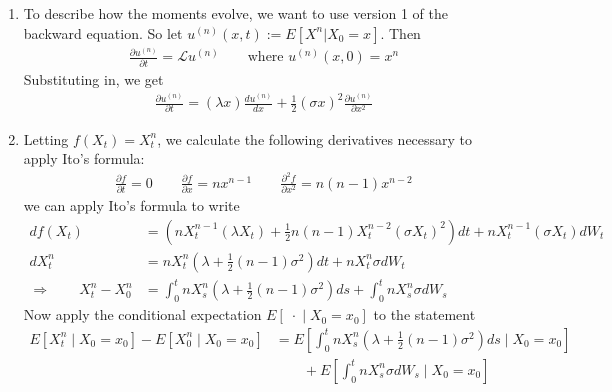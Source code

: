 \documentclass[12pt]{article}
\theoremstyle{plain}
\theoremstyle{definition}
\theoremstyle{remark}
\begin{document}
\begin{enumerate}
\begin{enumerate}
      \item %
        To describe how the moments evolve, we want to use version 1 of
        the backward equation. So let $u^{(n)}(x,t):=E[X^n|X_0=x]$. Then
        \begin{align*}
          \frac{\partial u^{(n)}}{\partial t} = \mathscr{L} u^{(n)}
          \qquad
          \text{where } u^{(n)}(x,0) = x^n
        \end{align*}
        Substituting in, we get
        \begin{align*}
          \frac{\partial u^{(n)}}{\partial t} =
          (\lambda x) \frac{du^{(n)}}{dx}
          + \frac{1}{2}(\sigma x)^2 \frac{\partial u^{(n)}}{\partial x^2}
        \end{align*}


      \item %
        Letting $f(X_t) = X_t^n$, we calculate the following derivatives
        necessary to apply Ito's formula:
        \begin{align*}
          \frac{\partial f}{\partial t} = 0
          \qquad
          \frac{\partial f}{\partial x} = nx^{n-1}
          \qquad
          \frac{\partial^2 f}{\partial x^2} = n(n-1)x^{n-2}
        \end{align*}
        we can apply Ito's formula to write
        \begin{align*}
          df(X_t)
          &= \left(
            nX_t^{n-1} (\lambda X_t)
            + \frac{1}{2}n(n-1)X_t^{n-2} (\sigma X_t)^2
            \right) dt
            + n X_t^{n-1} (\sigma X_t)dW_t \\
          dX^n_t
          &= nX_t^{n}\left(
            \lambda + \frac{1}{2}(n-1) \sigma^2
            \right) dt
            + n X_t^{n} \sigma dW_t \\
          \Rightarrow\qquad
          X^n_t - X^n_0
          &= \int^t_0 nX_s^{n}\left(
            \lambda + \frac{1}{2}(n-1) \sigma^2
            \right) ds
            + \int^t_0 n X_s^{n} \sigma dW_s
        \end{align*}
        Now apply the conditional expectation $E[\;\cdot\;|\; X_0=x_0]$
        to the statement
        \begin{align*}
          E[X^n_t\;|\;X_0=x_0] - E[X^n_0 \;|\; X_0=x_0]
          &= E\left[ \int^t_0 nX_s^{n}\left(
            \lambda + \frac{1}{2}(n-1) \sigma^2
            \right) ds\;\big| \;X_0=x_0\right]\\
          &\qquad
            + E\left[ \int^t_0 n X_s^{n} \sigma dW_s
                \;\big|\; X_0=x_0\right]

\end{align*}
\end{enumerate}
\end{enumerate}
\end{document}
